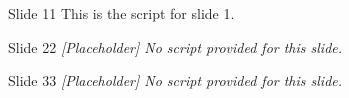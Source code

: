 \begin{SlideManuscriptBlock}[normalsize]{Slide 1}{1}
This is the script for slide 1.
\end{SlideManuscriptBlock}

\begin{SlideManuscriptBlock}[normalsize]{Slide 2}{2}
\textit{[Placeholder] No script provided for this slide.}
\end{SlideManuscriptBlock}

\begin{SlideManuscriptBlock}[normalsize]{Slide 3}{3}
\textit{[Placeholder] No script provided for this slide.}
\end{SlideManuscriptBlock}
